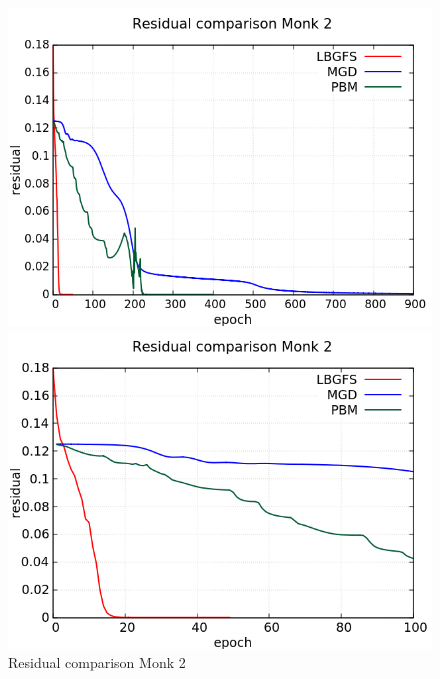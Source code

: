 \begin{figure}[H]
	\centering
	\begin{minipage}[t]{0.5\linewidth}
		\includegraphics[width=\linewidth]{data/Comparison/Monk2/Monk2_R_Comparison_standard.png}
	\end{minipage}%
	\begin{minipage}[t]{0.5\linewidth}
		\includegraphics[width=\linewidth]{data/Comparison/Monk2/Monk2_R_Comparison_zoom.png}
	\end{minipage}
	\caption{Residual comparison Monk 2}
	\label{R-Monk2}
\end{figure}
